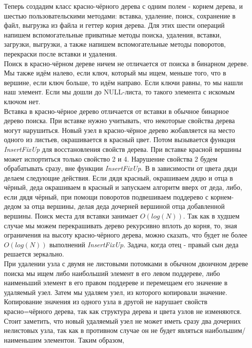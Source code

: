 Теперь создадим класс красно-чёрного дерева с одним полем - корнем дерева, и шестью пользовательскими методами: вставка,
удаление, поиск, сохранение в файл, выгрузка из файла и геттер корня дерева. Для этих шести операций напишем вспомогательные
приватные методы поиска, удаления, вставки, загрузки, выгрузки, а также напишем вспомогательные методы поворотов, перекраски
после вставки и удаления. 
\\Поиск в красно-чёрном дереве ничем не отличается от поиска в бинарном дереве. Мы также идём налево,
если ключ, который мы ищем, меньше того, что в вершине, если ключ больше, то идём направо. Если ключи равны, то мы нашли наш
элемент. Если мы дошли до NULL-листа, то такого элемента с искомым ключом нет.
\\Вставка в красно-чёрное дерево отличается от вставки в обычное бинарное дерево поиска. При вставке нужно учитывать, что некоторые
свойства дерева могут нарушиться. Новый узел в красно-чёрное дерево жобавляется на место одного из листьев, окрашивается в красный
цвет. Потом вызывается функция \textit{InsertFixUp} для восстановления свойств дерева. При вставке красной вершины может испортиться
только свойство 2 и 4. Нарушение свойства 2 будем обрабатывать сразу, вне функции \textit{InsertFixUp}. В  в зависимости
от цвета дяди делаем следующие действия. Если дядя красный, окрашиваем дядю и отца в чёрный, деда окрашиваем в красный и запускаем алгоритм
вверх от деда, либо, если дядя чёрный, при помощи поворотов подвешиваем поддерево с корнем-дедом за отца вершины, делая деда дочерней вершиной
отца добавленной вершины. Поиск места для вставки занимает $O(log(N))$. Так как в худшем случае мы можем перекрашивать дерево рекурсивно вплоть
до корня, то, зная ограничения на высоту красно-чёрного дерева, можно сказать, что будет не более $O(log(N))$ выполнений \textit{InsertFixUp}.
Задача, когда отец - правый сын деда решается зеркально.
\\При удалении узла с двумя не листовыми потомками в обычном двоичном дереве поиска мы ищем либо наибольший элемент в его левом поддереве, либо
наименьший элемент в его правом поддереве и перемещаем его значение в удаляемый узел. Затем мы удаляем узел, из которого копировали значение. Копирование
значения из одного узла в другой не нарушает свойств красно=чёрного дерева, так как структура дерева и цвета узлов не изменяются. Стоит заметить, что новый
удаляемый узел не может иметь сразу два дочерних нелистовых узла, так как в противном случае он не будет являться наибольшим/наименьшим элементои. Таким образом,
